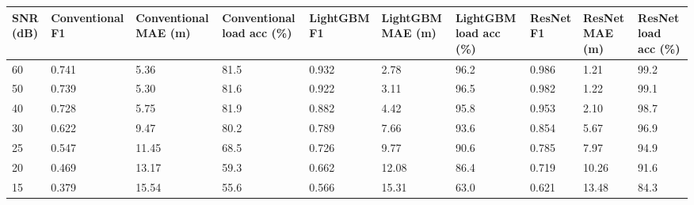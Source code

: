 \begin{tabular}{llllllllll}
\toprule
SNR (dB) & Conventional F1 & Conventional MAE (m) & Conventional load acc (\%) & LightGBM F1 & LightGBM MAE (m) & LightGBM load acc (\%) & ResNet F1 & ResNet MAE (m) & ResNet load acc (\%) \\
\midrule
60 & 0.741 & 5.36 & 81.5 & 0.932 & 2.78 & 96.2 & 0.986 & 1.21 & 99.2 \\
50 & 0.739 & 5.30 & 81.6 & 0.922 & 3.11 & 96.5 & 0.982 & 1.22 & 99.1 \\
40 & 0.728 & 5.75 & 81.9 & 0.882 & 4.42 & 95.8 & 0.953 & 2.10 & 98.7 \\
30 & 0.622 & 9.47 & 80.2 & 0.789 & 7.66 & 93.6 & 0.854 & 5.67 & 96.9 \\
25 & 0.547 & 11.45 & 68.5 & 0.726 & 9.77 & 90.6 & 0.785 & 7.97 & 94.9 \\
20 & 0.469 & 13.17 & 59.3 & 0.662 & 12.08 & 86.4 & 0.719 & 10.26 & 91.6 \\
15 & 0.379 & 15.54 & 55.6 & 0.566 & 15.31 & 63.0 & 0.621 & 13.48 & 84.3 \\
\bottomrule
\end{tabular}
